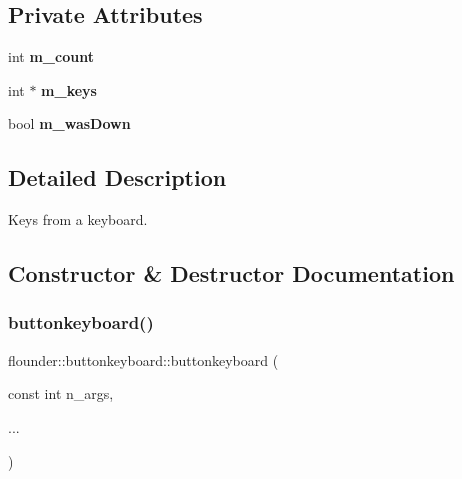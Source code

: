 \subsection*{Private Attributes}
\begin{DoxyCompactItemize}
\item 
\mbox{\label{classflounder_1_1buttonkeyboard_ac388d5c303d2bd2cddfc90853256d910}} 
int {\bfseries m\+\_\+count}
\item 
\mbox{\label{classflounder_1_1buttonkeyboard_a6347baab78a95b15c0c54c3d65355fde}} 
int $\ast$ {\bfseries m\+\_\+keys}
\item 
\mbox{\label{classflounder_1_1buttonkeyboard_a0d8fc28fc7e8293fa401a0b048dc26b6}} 
bool {\bfseries m\+\_\+was\+Down}
\end{DoxyCompactItemize}


\subsection{Detailed Description}
Keys from a keyboard. 



\subsection{Constructor \& Destructor Documentation}
\mbox{\label{classflounder_1_1buttonkeyboard_a1cb133f346df9c1f0f401574bde868bc}} 
\subsubsection{\texorpdfstring{buttonkeyboard()}{buttonkeyboard()}}
{\footnotesize\ttfamily flounder\+::buttonkeyboard\+::buttonkeyboard (\begin{DoxyParamCaption}\item[{const int}]{n\+\_\+args,  }\item[{}]{... }\end{DoxyParamCaption})\hspace{0.3cm}{\ttfamily [inline]}}



